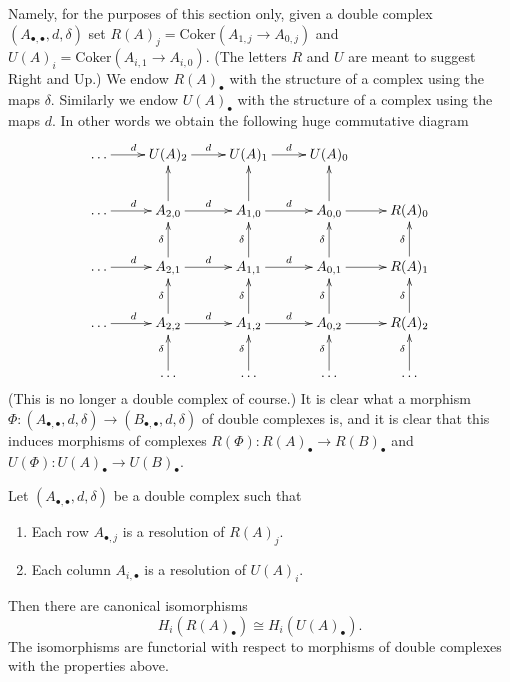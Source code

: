 \medskip\noindent
Namely, for the purposes of this section only, given a double
complex $(A_{\bullet,\bullet}, d, \delta)$ set
$R(A)_j = \text{Coker}(A_{1,j} \to A_{0,j})$ and
$U(A)_i = \text{Coker}(A_{i,1} \to A_{i,0})$. (The letters
$R$ and $U$ are meant to suggest Right and Up.)
We endow $R(A)_\bullet$ with the structure of a complex
using the maps $\delta$. Similarly we endow $U(A)_\bullet$
with the structure of a complex using the maps $d$.
In other words we obtain the following huge commutative diagram
$$
\xymatrix{
\ldots \ar[r]^d &
U(A)_2 \ar[r]^d &
U(A)_1 \ar[r]^d &
U(A)_0 &
\cr
\ldots \ar[r]^d &
A_{2,0} \ar[r]^d \ar[u] &
A_{1,0} \ar[r]^d \ar[u] &
A_{0,0} \ar[r] \ar[u] &
R(A)_0 \cr
\ldots \ar[r]^d &
A_{2,1} \ar[r]^d \ar[u]^\delta &
A_{1,1} \ar[r]^d \ar[u]^\delta &
A_{0,1} \ar[r] \ar[u]^\delta &
R(A)_1 \ar[u]^\delta \cr
\ldots \ar[r]^d &
A_{2,2} \ar[r]^d \ar[u]^\delta &
A_{1,2} \ar[r]^d \ar[u]^\delta &
A_{0,2} \ar[r] \ar[u]^\delta &
R(A)_2 \ar[u]^\delta \cr
&
\ldots \ar[u]^\delta &
\ldots \ar[u]^\delta &
\ldots \ar[u]^\delta &
\ldots \ar[u]^\delta \cr
}
$$
(This is no longer a double complex of course.)
It is clear what a morphism $\Phi : (A_{\bullet,\bullet}, d, \delta)
\to (B_{\bullet,\bullet}, d, \delta)$ of double complexes
is, and it is clear that this induces morphisms of complexes
$R(\Phi) : R(A)_\bullet \to R(B)_\bullet$ and
$U(\Phi) : U(A)_\bullet \to U(B)_\bullet$.

\begin{lemma}
\label{lemma-no-spectral-sequence}
Let $(A_{\bullet,\bullet}, d, \delta)$ be a double complex such
that
\begin{enumerate}
\item Each row $A_{\bullet, j}$ is a resolution of $R(A)_j$.
\item Each column $A_{i, \bullet}$ is a resolution of $U(A)_i$.
\end{enumerate}
Then there are canonical isomorphisms
$$
H_i(R(A)_\bullet)
\cong
H_i(U(A)_\bullet).
$$
The isomorphisms are functorial with respect to morphisms
of double complexes with the properties above.
\end{lemma}

